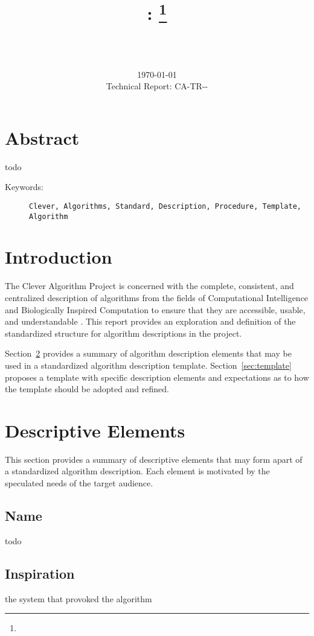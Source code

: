 \documentclass[a4paper, 11pt]{article}
\title{{\myreporttitle}: {\myreportsubtitle}\footnote{\myreportlicense}}
\author{\myreportauthor\\{\myreportemail}\\\small\myreportproject}
\date{\today\\{\small{Technical Report: CA-TR-{\myreportdate}-\myreportversion}}}
\begin{document}
\maketitle

\section*{Abstract} 
todo

\begin{description}
	\item[Keywords:] {\small\texttt{Clever, Algorithms, Standard, Description, Procedure, Template, Algorithm}}
\end{description} 

\section{Introduction}
\label{sec:introduction}
The Clever Algorithm Project is concerned with the complete, consistent, and centralized description of algorithms from the fields of Computational Intelligence and Biologically Inspired Computation to ensure that they are accessible, usable, and understandable \cite{Brownlee2010}.
This report provides an exploration and definition of the standardized structure for algorithm descriptions in the project.

Section~\ref{sec:elements} provides a summary of algorithm description elements that may be used in a standardized algorithm description template. Section~\ref{sec:template} proposes a template with specific description elements and expectations as to how the template should be adopted and refined.

\section{Descriptive Elements}
\label{sec:elements}
This section provides a summary of descriptive elements that may form apart of a standardized algorithm description. Each element is motivated by the speculated needs of the target audience.

\subsection{Name}
todo

\subsection{Inspiration}
the system that provoked the algorithm
\end{document}
